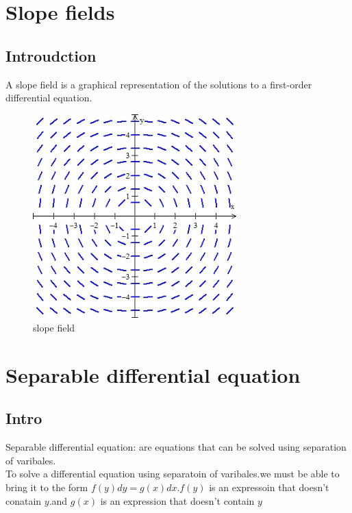 \documentclass{article}
\begin{document}
                \section{Slope fields}
                          \subsection{Introudction}
                               A slope field is a graphical representation of the solutions to a first-order differential equation.
                               \begin{figure}[ht]  
                                \centering
                                \includegraphics[bb=0 0 323 262, width=0.7\textwidth]{images/slope-field-1.jpg}
                                \caption{slope field}\label{fig:slope field}
                            \end{figure} 
                \section{Separable differential equation}
                        \subsection{Intro}
                            Separable differential equation: are equations that can be solved using separation of varibales.\\
                            To solve a differential equation using separatoin of varibales.we must be able to bring it to the form \(f(y)dy = g(x)dx\).\(f(y)\) is an expressoin that doesn't conatain \(y\).and \(g(x)\) is an expression that doesn't contain \(y\) 
\end{document}
